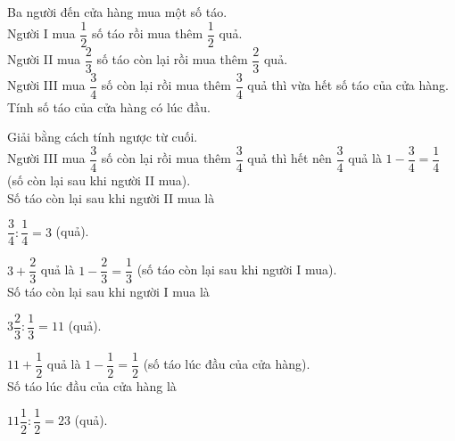 \begin{bt}%
	Ba người đến cửa hàng mua một số táo. \\
	Người I mua $\dfrac{1}{2}$ số táo rồi mua thêm $\dfrac{1}{2}$ quả. \\
	Người II mua $\dfrac{2}{3}$ số táo còn lại rồi mua thêm $\dfrac{2}{3}$ quả.\\
	Người III mua $\dfrac{3}{4}$ số còn lại rồi mua thêm $\dfrac{3}{4}$ quả thì vừa hết số táo của cửa hàng. \\
	Tính số táo của cửa hàng có lúc đầu.
	\loigiai
	{
		Giải bằng cách tính ngược từ cuối.\\
		Người III mua $\dfrac{3}{4}$ số còn lại rồi mua thêm $\dfrac{3}{4}$ quả thì hết nên $\dfrac{3}{4}$ quả là $1-\dfrac{3}{4}=\dfrac{1}{4}$ (số còn lại sau khi người II mua).\\
		Số táo còn lại sau khi người II mua là 
		\begin{center}
			$\dfrac{3}{4}:\dfrac{1}{4}=3$ (quả).
		\end{center}
		$3+\dfrac{2}{3}$ quả là $1-\dfrac{2}{3}=\dfrac{1}{3}$ (số táo còn lại sau khi người I mua).\\
		Số táo còn lại sau khi người I mua là 
		\begin{center}
			$3\dfrac{2}{3}:\dfrac{1}{3}=11$ (quả).
		\end{center}
		$11+\dfrac{1}{2}$ quả là $1-\dfrac{1}{2}=\dfrac{1}{2}$ (số táo lúc đầu của cửa hàng).\\
		Số táo lúc đầu của cửa hàng là 
		\begin{center}
			$11\dfrac{1}{2}:\dfrac{1}{2}=23$ (quả).
		\end{center}
	}
\end{bt}
